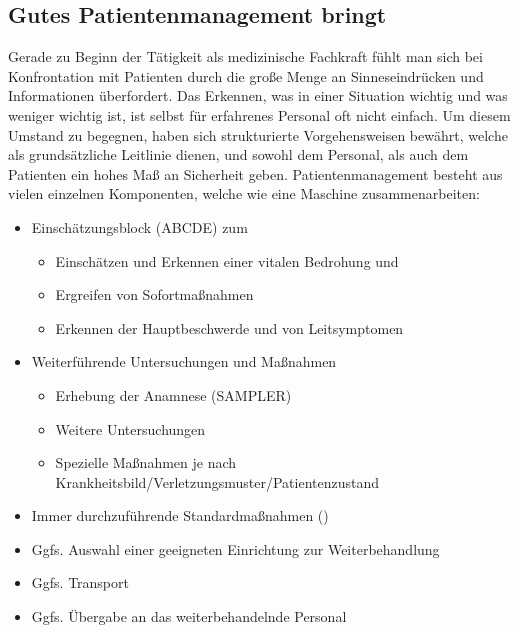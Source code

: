\subsection{Gutes Patientenmanagement bringt } 
Gerade zu Beginn der Tätigkeit als medizinische
Fachkraft fühlt man sich bei Konfrontation mit Patienten durch die
große Menge an Sinneseindrücken und Informationen überfordert. 
Das Erkennen, was in einer Situation wichtig und was weniger
wichtig ist, ist selbst für erfahrenes Personal oft nicht einfach.
Um diesem Umstand zu begegnen, haben sich strukturierte
Vorgehensweisen bewährt, welche als grundsätzliche Leitlinie
dienen, und sowohl dem Personal, als auch dem Patienten ein
hohes Maß an Sicherheit geben.
Patientenmanagement besteht aus vielen einzelnen
Komponenten, welche wie eine Maschine zusammenarbeiten:
\begin{itemize}
	\item Einschätzungsblock (ABCDE) zum
	\begin{itemize}
		\item Einschätzen und
		Erkennen einer vitalen Bedrohung und
		\item Ergreifen von Sofortmaßnahmen
		\item Erkennen der Hauptbeschwerde und von Leitsymptomen
	\end{itemize}
	\item Weiterführende Untersuchungen und Maßnahmen
	\begin{itemize}
		\item Erhebung der Anamnese (SAMPLER)
		\item Weitere Untersuchungen
		\item Spezielle Maßnahmen je nach Krankheitsbild/Verletzungsmuster/Patientenzustand
	\end{itemize}
	\item Immer durchzuführende Standardmaßnahmen
	()
	\item Ggfs. Auswahl einer geeigneten Einrichtung zur
	Weiterbehandlung
	\item Ggfs. Transport
	\item Ggfs. Übergabe an das weiterbehandelnde Personal
\end{itemize}




